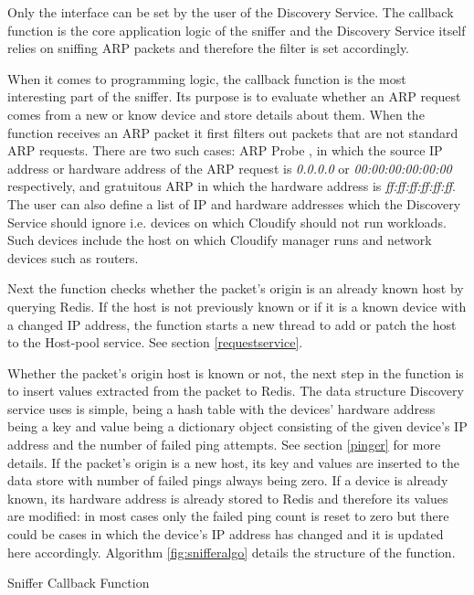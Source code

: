 Only the interface can be set by the user of the Discovery Service. The callback function is the core application logic of the sniffer and the Discovery Service itself relies on sniffing ARP packets and therefore the filter is set accordingly.

When it comes to programming logic, the callback function is the most interesting part of the sniffer. Its purpose is to evaluate whether an ARP request comes from a new or know device and store details about them. When the function receives an ARP packet it first filters out packets that are not standard ARP requests. There are two such cases: ARP Probe \cite{rfc5227}, in which the source IP address or hardware address of the ARP request is \textit{0.0.0.0} or \textit{00:00:00:00:00:00} respectively, and gratuitous ARP in which the hardware address is \textit{ff:ff:ff:ff:ff:ff}. The user can also define a list of IP and hardware addresses which the Discovery Service should ignore i.e. devices on which Cloudify should not run workloads. Such devices include the host on which Cloudify manager runs and network devices such as routers.

Next the function checks whether the packet's origin is an already known host by querying Redis. If the host is not previously known or if it is a known device with a changed IP address, the function starts a new thread to add or patch the host to the Host-pool service. See section \ref{requestservice}.

Whether the packet's origin host is known or not,    the next step in the function is to insert values extracted from the packet to Redis. The data structure Discovery service uses is simple, being a hash table with the devices' hardware address being a key and value being a dictionary object consisting of the given device's IP address and the number of failed ping attempts. See section \ref{pinger} for more details. If the packet's origin is a new host, its key and values are inserted to the data store with number of failed pings always being zero. If a device is already known, its hardware address is already stored to Redis and therefore its values are modified: in most cases only the failed ping count is reset to zero but there could be cases in which the device's IP address has changed and it is updated here accordingly. Algorithm \ref{fig:snifferalgo} details the structure of the function.

\begin{algorithm}[H]
\label{fig:snifferalgo}
\begin{center}
\end{center}
\caption{Sniffer Callback Function}
\end{algorithm}

